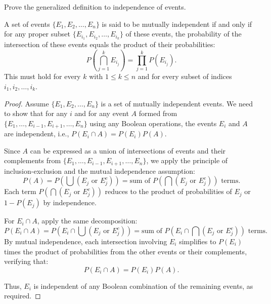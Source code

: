     \begin{exercise}
        Prove the generalized definition to independence of events.
        \begin{theorem}
            A set of events \( \{E_1, E_2, \dots, E_n\} \) is said to be mutually independent if and only if for any proper subset \( \{E_{i_1}, E_{i_2}, \dots, E_{i_k}\} \) of these events, the probability of the intersection of these events equals the product of their probabilities:
            \[
            P\left(\bigcap_{j=1}^k E_{i_j}\right) = \prod_{j=1}^k P(E_{i_j}).
            \]
            This must hold for every \( k \) with \( 1 \leq k \leq n \) and for every subset of indices \( i_1, i_2, \dots, i_k \).
            \end{theorem}
    \end{exercise}
    \begin{proof}
        Assume \( \{E_1, E_2, \dots, E_n\} \) is a set of mutually independent events. We need to show that for any \( i \) and for any event \( A \) formed from \( \{E_1, \dots, E_{i-1}, E_{i+1}, \dots, E_n\} \) using any Boolean operations, the events \( E_i \) and \( A \) are independent, i.e., \( P(E_i \cap A) = P(E_i)P(A) \).
        
        Since \( A \) can be expressed as a union of intersections of events and their complements from \( \{E_1, \dots, E_{i-1}, E_{i+1}, \dots, E_n\} \), we apply the principle of inclusion-exclusion and the mutual independence assumption:
        \[
        P(A) = P\left(\bigcup (E_j \text{ or } E_j^c)\right) = \text{sum of } P\left(\bigcap (E_j \text{ or } E_j^c)\right) \text{ terms}.
        \]
        Each term \( P\left(\bigcap (E_j \text{ or } E_j^c)\right) \) reduces to the product of probabilities of \( E_j \) or \( 1 - P(E_j) \) by independence.
        
        For \( E_i \cap A \), apply the same decomposition:
        \[
        P(E_i \cap A) = P\left(E_i \cap \bigcup (E_j \text{ or } E_j^c)\right) = \text{sum of } P(E_i \cap \bigcap (E_j \text{ or } E_j^c)) \text{ terms}.
        \]
        By mutual independence, each intersection involving \( E_i \) simplifies to \( P(E_i) \) times the product of probabilities from the other events or their complements, verifying that:
        \[
        P(E_i \cap A) = P(E_i)P(A).
        \]
        
        Thus, \( E_i \) is independent of any Boolean combination of the remaining events, as required.
        \end{proof}
    	
